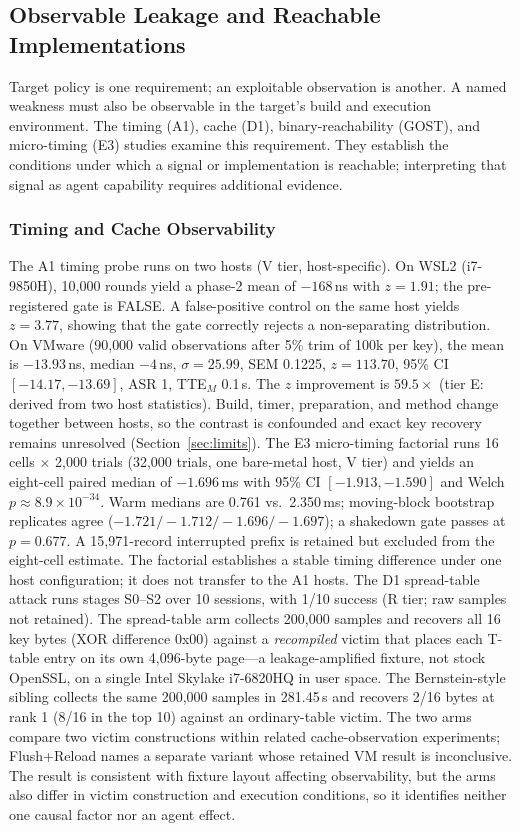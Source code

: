 \subsection{Observable Leakage and Reachable Implementations}
\label{sec:leakage}
Target policy is one requirement; an exploitable observation is another.
A named weakness must
also be observable in the target's build and execution environment. The timing
(A1), cache (D1), binary-reachability (GOST), and micro-timing (E3) studies
examine this requirement. They establish the conditions under which a signal
or implementation is reachable; interpreting that signal as agent capability
requires additional evidence.
\subsubsection{Timing and Cache Observability}\label{sec:a1}
The A1 timing probe runs on two hosts (V tier, host-specific). On WSL2
(i7-9850H), 10{,}000 rounds yield a phase-2 mean of $-168$\,ns with
$z=1.91$; the pre-registered gate is FALSE. A false-positive control on the
same host yields $z=3.77$, showing that the gate correctly rejects a
non-separating distribution. On VMware (90{,}000 valid observations after
5\% trim of 100k per key), the mean is $-13.93$\,ns, median $-4$\,ns,
$\sigma=25.99$, SEM 0.1225, $z=113.70$, 95\% CI $[-14.17,-13.69]$, ASR 1,
TTE$_M$ 0.1\,s. The $z$ improvement is $59.5\times$ (tier E: derived from two
host statistics). Build, timer, preparation, and method change together
between hosts, so the contrast is confounded and exact key recovery remains
unresolved (Section~\ref{sec:limits}).
The E3 micro-timing factorial runs 16 cells $\times$ 2{,}000 trials
(32{,}000 trials, one bare-metal host, V tier) and yields an eight-cell paired
median of $-1.696$\,ms with 95\% CI $[-1.913,-1.590]$ and Welch
$p\approx8.9\times10^{-34}$. Warm medians are 0.761 vs.\ 2.350\,ms;
moving-block bootstrap replicates agree
($-1.721/-1.712/-1.696/-1.697$); a shakedown gate passes at $p=0.677$. A
15{,}971-record interrupted prefix is retained but excluded from the
eight-cell estimate. The factorial establishes a stable timing difference
under one host configuration; it does not transfer to the A1 hosts.
The D1 spread-table attack runs stages S0--S2 over 10 sessions, with 1/10
success (R tier; raw samples not retained). The spread-table arm collects
200{,}000 samples and recovers all 16 key bytes (XOR difference 0x00) against
a \emph{recompiled} victim that places each T-table entry on its own
4{,}096-byte page---a leakage-amplified fixture, not stock OpenSSL, on a
single Intel Skylake i7-6820HQ in user space. The Bernstein-style sibling
collects the same 200{,}000 samples in 281.45\,s and recovers 2/16 bytes at
rank 1 (8/16 in the top 10) against an ordinary-table victim. The two arms
compare two victim constructions within related cache-observation experiments;
Flush+Reload names a separate variant whose retained VM result is
inconclusive. The result is consistent with fixture layout affecting
observability, but the arms also differ in victim construction and execution
conditions, so it identifies neither one causal factor nor an agent effect.
